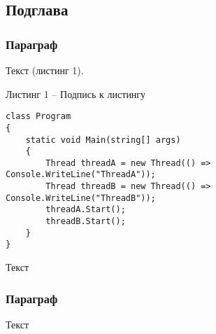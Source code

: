 
\subsection{Подглава}\vspace{-7mm}
\subsubsection{Параграф}
Текст (листинг 1).
\par Листинг 1 -- Подпись к листингу\\
\large
\begin{verbatim}
class Program
{
    static void Main(string[] args)
    {
        Thread threadA = new Thread(() => Console.WriteLine("ThreadA"));
        Thread threadB = new Thread(() => Console.WriteLine("ThreadB"));
        threadA.Start();
        threadB.Start();
    }
}
\end{verbatim}
\Large
\par
Текст

\subsubsection{Параграф}
Текст

